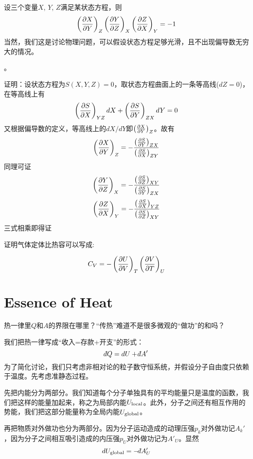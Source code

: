 \documentclass[CJK]{beamer}
\begin{document}
\begin{frame}
\bch
设三个变量$X$, $Y$, $Z$满足某状态方程，则
{\blue 
$$\left(\frac{\partial X}{\partial Y}\right)_{Z}  \left(\frac{\partial Y}{\partial Z}\right)_{X} \left(\frac{\partial Z}{\partial X}\right)_{Y} = -1$$
}
当然，我们这是讨论物理问题，可以假设状态方程足够光滑，且不出现偏导数无穷大的情况。

\skipline

。
\ech
\end{frame}

\begin{frame}
\bch
{\scriptsize
证明：设状态方程为$S(X, Y, Z) = 0$，取状态方程曲面上的一条等高线($dZ = 0$)，在等高线上有
$$\left(\frac{\partial S}{\partial X}\right)_{YZ} dX + \left(\frac{\partial S}{\partial Y}\right)_{ZX} dY = 0$$
又根据偏导数的定义，等高线上的$dX/dY$即$\left(\frac{\partial X}{\partial Y}\right)_{Z}$。故有
$$\left(\frac{\partial X}{\partial Y}\right)_{Z} = -\frac{\left(\frac{\partial S}{\partial Y}\right)_{ZX}}{\left(\frac{\partial S}{\partial X}\right)_{ZY}}$$
同理可证
$$\left(\frac{\partial Y}{\partial Z}\right)_{X} = -\frac{\left(\frac{\partial S}{\partial Z}\right)_{XY}}{\left(\frac{\partial S}{\partial Y}\right)_{ZX}}$$
$$\left(\frac{\partial Z}{\partial X}\right)_{Y} = -\frac{\left(\frac{\partial S}{\partial X}\right)_{YZ}}{\left(\frac{\partial S}{\partial Z}\right)_{XY}}$$
三式相乘即得证
}
\ech
\end{frame}



\begin{frame}
\bch
{}

证明气体定体比热容可以写成:

$$
C_V =  - \left(\frac{\partial U}{\partial V}\right)_{T} \left(\frac{\partial V}{\partial T}\right)_{U} 
$$

\ech
\end{frame}

\section{Essence of Heat}

\begin{frame}
\bch


热一律里$Q$和$A$的界限在哪里？“传热”难道不是很多微观的“做功”的和吗？

\ech
\end{frame}


\begin{frame}
\bch
我们把热一律写成“收入=存款+开支”的形式：
$$ \dbar Q =  d U + \dbar A'$$
为了简化讨论，我们只考虑非相对论的粒子数守恒系统，并假设分子自由度只依赖于温度。先考虑准静态过程。

\skipline

先把内能分为两部分。我们知道每个分子单独具有的平均能量只是温度的函数，我们把这样的能量加起来，称之为{\blue 局部内能$U_{\rm local}$}。此外，分子之间还有相互作用的势能，我们把这部分能量称为{\blue 全局内能$U_{\rm global}$}。


再把物质对外做功也分为两部分。因为分子运动造成的{\blue 动理压强$p_k$对外做功记$ A_k'$}，因为分子之间相互吸引造成的{\blue 内压强$p_U$对外做功记为$ A'_U$}。显然
{\blue
$$ d U_{\rm global} = - \dbar A'_U$$
}
\ech
\end{frame}
\end{document}
